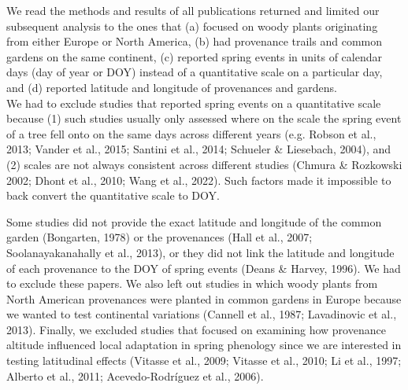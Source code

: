 \documentclass{article}
\begin{document}

We read the methods and results of all publications returned and limited our subsequent analysis to the ones that (a) focused on woody plants originating from either Europe or North America, (b) had provenance trails and common gardens on the same continent, (c) reported spring events in units of calendar days (day of year or DOY) instead of a quantitative scale on a particular day, and (d) reported latitude and longitude of provenances and gardens. 
\\
We had to exclude studies that reported spring events on a quantitative scale because (1) such studies usually only assessed where on the scale the spring event of a tree fell onto on the same days across different years (e.g. Robson et al., 2013; Vander et al., 2015; Santini et al., 2014; Schueler \& Liesebach, 2004), and (2) scales are not always consistent across different studies (Chmura \& Rozkowski 2002; Dhont et al., 2010; Wang et al., 2022). Such factors made it impossible to back convert the quantitative scale to DOY.

Some studies did not provide the exact latitude and longitude of the common garden (Bongarten, 1978) or the provenances (Hall et al., 2007; Soolanayakanahally et al., 2013), or they did not link the latitude and longitude of each provenance to the DOY of spring events (Deans \& Harvey, 1996). We had to exclude these papers. We also left out studies in which woody plants from North American provenances were planted in common gardens in Europe because we wanted to test continental variations (Cannell et al., 1987; Lavadinovic et al., 2013). Finally, we excluded studies that focused on examining how provenance altitude influenced local adaptation in spring phenology since we are interested in testing latitudinal effects (Vitasse et al., 2009; Vitasse et al., 2010; Li et al., 1997; Alberto et al., 2011; Acevedo-Rodríguez et al., 2006). 
\end{document}
